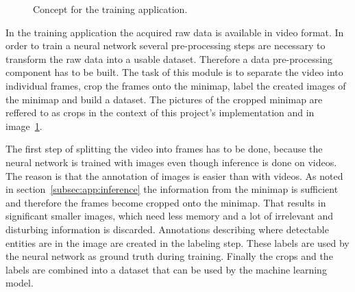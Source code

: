 \begin{figure}
	\caption{Concept for the training application.}
	\label{fig:app:conceptTrain}
\end{figure}

In the training application the acquired raw data is available in video format. In order to train a neural 
network several pre-processing steps are necessary to transform the raw data into a usable dataset. 
Therefore a data pre-processing component has to be built. The task of this module is to separate 
the video into individual frames, crop the frames onto the minimap, label the created images of the 
minimap and build a dataset. The pictures of the cropped minimap are reffered to as crops in the 
context of this project's implementation and in image~\ref{fig:app:conceptTrain}.

The first step of splitting the video into frames has to be done, because the neural network is 
trained with images even though inference is done on videos. The reason is that the annotation of 
images is easier than with videos. As noted in section~\ref{subsec:app:inference} the information 
from the minimap is sufficient and therefore the frames become cropped onto the minimap. That 
results in significant smaller images, which need less memory and a lot of irrelevant and disturbing 
information is discarded. Annotations describing where detectable entities are in the image are 
created in the labeling step. These labels are used by the neural network as ground truth 
during training. Finally the crops and the labels are combined into a dataset that can be used by the 
machine learning model.

